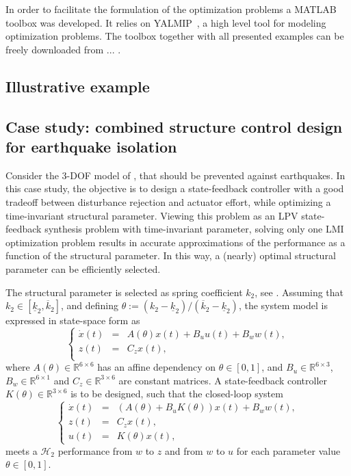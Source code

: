 \documentclass{article}
\newcommand{\ppar}{\theta}                          %
\begin{document}
In order to facilitate the formulation of the optimization problems a MATLAB
toolbox was developed. It relies on YALMIP~\cite{YALMIP}, a high level tool for
modeling optimization problems. The toolbox together with all presented examples can
be freely downloaded from ... .

\subsection{Illustrative example}


\subsection{Case study: combined structure control design for earthquake isolation}
Consider the 3-DOF model of \cite{Camino_2003}, that should be prevented against earthquakes. In this case study, the objective is to design a state-feedback controller with a good tradeoff between disturbance rejection and actuator effort, while optimizing a time-invariant structural parameter. Viewing this problem as an LPV state-feedback synthesis problem with time-invariant parameter, solving only one LMI optimization problem results in accurate approximations of the performance as a function of the structural parameter. In this way, a (nearly) optimal structural parameter can be efficiently selected.

The structural parameter is selected as spring coefficient $k_2$, see \cite{Camino_2003}. Assuming that $k_2 \in [\underline{k}_2, \overline{k}_2]$, and defining $\ppar := (k_2 - \underline{k}_2)/(\overline{k}_2 - \underline{k}_2)$, the system model is expressed in state-space form as
\begin{equation*}
\left\{ \begin{array}{rcl}
	\dot{x}(t) & = & A(\ppar)x(t) + B_u u(t) + B_w w(t), \\
	z(t) & = & C_z x(t), \\
\end{array} \right.
\end{equation*}
where $A(\ppar) \in \mathbb{R}^{6 \times 6}$ has an affine dependency on $\ppar \in [0,1]$, and $B_u \in \mathbb{R}^{6 \times 3}$, $B_w \in \mathbb{R}^{6 \times 1}$ and $C_z \in \mathbb{R}^{3 \times 6}$ are constant matrices. A state-feedback controller $K(\ppar) \in \mathbb{R}^{3 \times 6}$ is to be designed, such that the closed-loop system
\begin{equation*}
\left\{ \begin{array}{rcl}
	\dot{x}(t) & = & (A(\ppar) + B_u K(\ppar))x(t) + B_w w(t), \\
	z(t) & = & C_z x(t), \\
	u(t) & = & K(\ppar) x(t),
\end{array} \right.
\end{equation*}
meets a $\mathcal{H}_2$ performance from $w$ to $z$ and from $w$ to $u$ for each parameter value $\ppar \in [0,1]$.
\end{document}
